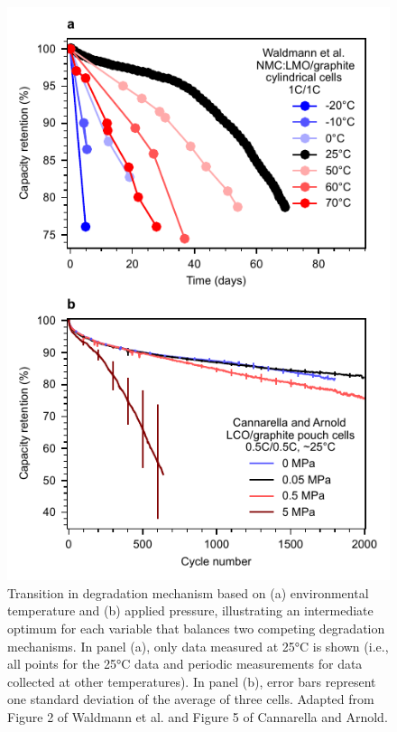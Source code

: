 \documentclass[journal=jpclcd,manuscript=article]{achemso}
\begin{document}
\begin{figure}[ht!]
\centering
\includegraphics[scale = 1.0]{final_figures/temperature_and_pressure.pdf}
\caption{Transition in degradation mechanism based on (a) environmental temperature and (b) applied pressure, illustrating an intermediate optimum for each variable that balances two competing degradation mechanisms.
In panel (a), only data measured at 25°C is shown (i.e., all points for the 25°C data and periodic measurements for data collected at other temperatures).
In panel (b), error bars represent one standard deviation of the average of three cells. 
Adapted from Figure 2 of Waldmann et al.\cite{waldmann_temperature_2014}{} and Figure 5 of Cannarella and Arnold\cite{cannarella_stress_2014}{}.}
\label{fig:temperature_and_pressure}
\end{figure}
\end{document}
